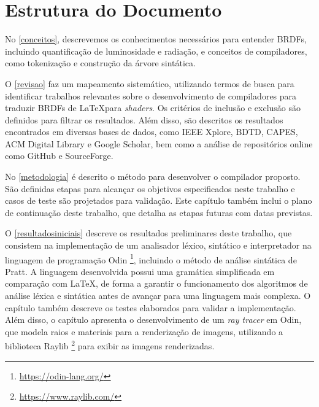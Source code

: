 \documentclass[english, 
               brazil, 
               bsc] %
               {dcomp-abntex2}
\begin{document}
\section{Estrutura do Documento}
No \autoref{conceitos}, descrevemos os conhecimentos necessários para entender BRDFs, incluindo quantificação de luminosidade e radiação, e  conceitos de compiladores, como tokenização e construção da árvore sintática.


O \autoref{revisao} faz um mapeamento sistemático, utilizando termos de busca para identificar trabalhos relevantes sobre o desenvolvimento de compiladores para traduzir BRDFs de \LaTeX  para \textit{shaders}. Os critérios de inclusão e exclusão são definidos para filtrar os resultados. Além disso, são descritos os resultados encontrados em diversas bases de dados, como IEEE Xplore, BDTD, CAPES, ACM Digital Library e Google Scholar, bem como a análise de repositórios online como GitHub e SourceForge. 


No \autoref{metodologia} é descrito o método para desenvolver o compilador proposto. São definidas etapas para alcançar os objetivos especificados neste trabalho e casos de teste são projetados para validação. Este capítulo também inclui o plano de continuação deste trabalho, que detalha as etapas futuras com datas previstas.




O \autoref{resultadosiniciais} descreve os resultados preliminares deste trabalho, que consistem na implementação de um analisador léxico, sintático e interpretador na linguagem de programação Odin \footnote{\url{https://odin-lang.org/}}, incluindo o método de análise sintática de Pratt. A linguagem desenvolvida possui uma gramática simplificada em comparação com \LaTeX, de forma a garantir o funcionamento dos algoritmos de análise léxica e sintática antes de avançar para uma linguagem mais complexa. O capítulo também descreve os testes elaborados para validar a implementação. Além disso, o capítulo apresenta o desenvolvimento de um \textit{ray tracer} em Odin, que modela raios e materiais para a renderização de imagens, utilizando a biblioteca Raylib \footnote{\url{https://www.raylib.com/}} para exibir as imagens renderizadas.
\end{document}

